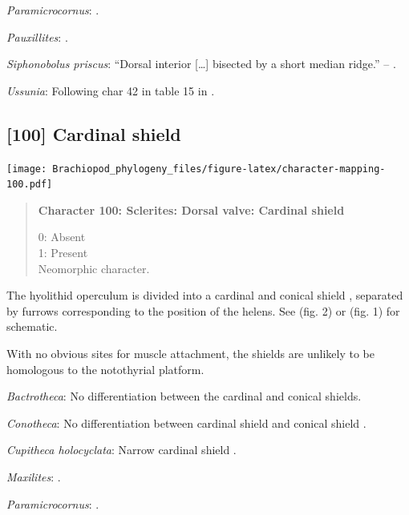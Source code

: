 \documentclass[openany]{book}
\begin{document}
\hypertarget{Paramicrocornus-coding-99}{}
\emph{Paramicrocornus}: \citet{Zhang2018Ahyolithid}.

\hypertarget{Pauxillites-coding-99}{}
\emph{Pauxillites}: \citet{Marek1966}.

\hypertarget{Siphonobolus_priscus-coding-99}{}
\emph{Siphonobolus priscus}: ``Dorsal interior {[}\ldots{}{]} bisected
by a short median ridge.'' -- \citet{Popov2009Earlyontogeny}.

\hypertarget{Ussunia-coding-99}{}
\emph{Ussunia}: Following char 42 in table 15 in
\citet{Williams2000LinguliformeaCraniiformea}.

\subsection*{{[}100{]} Cardinal shield}\label{cardinal-shield}

\texttt{[image: Brachiopod\_phylogeny\_files/figure-latex/character-mapping-100.pdf]}

\begin{quote}
\textbf{Character 100: Sclerites: Dorsal valve: Cardinal shield}

0: Absent\\
1: Present\\
Neomorphic character.
\end{quote}

The hyolithid operculum is divided into a cardinal and conical shield
\citep{Zhang2018Ahyolithid}, separated by furrows corresponding to the
position of the helens. See \citet{Marek1976} (fig. 2) or
\citet{MartiMus2005} (fig. 1) for schematic.

With no obvious sites for muscle attachment, the shields are unlikely to
be homologous to the notothyrial platform.

\hypertarget{Bactrotheca-coding-100}{}
\emph{Bactrotheca}: No differentiation between the cardinal and conical
shields.

\hypertarget{Conotheca-coding-100}{}
\emph{Conotheca}: No differentiation between cardinal shield and conical
shield \citep{Wrona2003, Devaere2014}.

\hypertarget{Cupitheca_holocyclata-coding-100}{}
\emph{Cupitheca holocyclata}: Narrow cardinal shield
\citep{Skovsted2016}.

\hypertarget{Maxilites-coding-100}{}
\emph{Maxilites}: \citet{Marek1972}.

\hypertarget{Paramicrocornus-coding-100}{}
\emph{Paramicrocornus}: \citet{Zhang2018Ahyolithid}.
\end{document}
